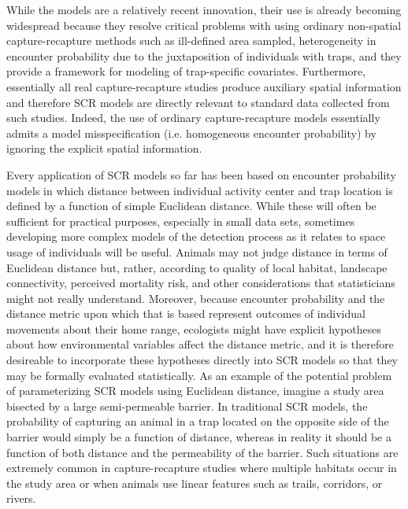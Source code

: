\documentclass[12pt]{article}
\begin{document}
While the models are a relatively recent innovation, their use is
already becoming widespread \citep{efford_etal:2009,
  gardner_etal:2010, kery_etal:2010, efford:2011UO,
  gopalaswamy_etal:2012, foster_harmsen:2012} because they resolve critical problems with using
ordinary non-spatial capture-recapture methods such as ill-defined
area sampled, heterogeneity in encounter probability due to the
juxtaposition of individuals with traps, and they provide a framework
for modeling of trap-specific covariates.  Furthermore, essentially
all real capture-recapture studies produce auxiliary spatial
information and therefore SCR models are directly relevant to standard
data collected from such studies. Indeed, the use of ordinary
capture-recapture models essentially admits a model misspecification
(i.e. homogeneous encounter probability) by ignoring the explicit
spatial information.

Every application of SCR models so far has been based on encounter
probability models in which distance between individual activity
center and trap location is defined by a function of simple Euclidean
distance.  While these will often be sufficient for practical
purposes, especially in small data sets, sometimes developing more
complex models of the detection process as it relates to space usage
of individuals will be useful.  Animals may not judge distance in
terms of Euclidean distance but, rather, according to quality of local
habitat, landscape connectivity, perceived mortality risk, and other
considerations that statisticians might not really
understand. Moreover, because encounter probability and the distance
metric upon which that is based represent outcomes of individual
movements about their home range, ecologists might have explicit
hypotheses about how environmental variables affect the distance
metric, and it is therefore desireable to incorporate these hypotheses
directly into SCR models so that they may be formally evaluated
statistically.
As an example of the potential problem of parameterizing SCR models
using Euclidean distance, imagine a study area bisected by a large
semi-permeable barrier. In traditional SCR models, the probability of
capturing an animal in a trap located on the opposite side of the
barrier would simply be a function of distance, whereas in reality it
should be a function of both distance and the permeability of the
barrier. Such situations are extremely common in capture-recapture
studies where multiple habitats occur in the study area or when
animals use linear features such as trails, corridors, or rivers.
\end{document}
